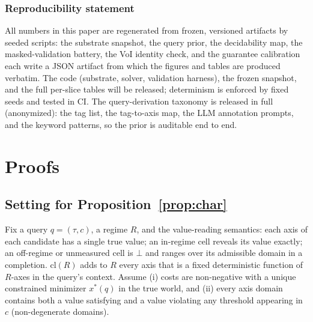 \documentclass{article} %
\newcommand{\cl}{\mathrm{cl}}
\newcommand{\bbot}{\bot}
\begin{document}
\subsubsection*{Reproducibility statement}
All numbers in this paper are regenerated from frozen, versioned artifacts by seeded scripts: the substrate snapshot, the query prior, the decidability map, the masked-validation battery, the VoI identity check, and the guarantee calibration each write a JSON artifact from which the figures and tables are produced verbatim. The code (substrate, solver, validation harness), the frozen snapshot, and the full per-slice tables will be released; determinism is enforced by fixed seeds and tested in CI. The query-derivation taxonomy is released in full (anonymized): the tag list, the tag-to-axis map, the LLM annotation prompts, and the keyword patterns, so the prior is auditable end to end.




\appendix
\section{Proofs}
\label{app:proofs}

\subsection{Setting for Proposition~\ref{prop:char}}
Fix a query $q=(\tau, c)$, a regime $R$, and the value-reading semantics: each axis of each candidate has a single true value; an in-regime cell reveals its value exactly; an off-regime or unmeasured cell is $\bbot$ and ranges over its admissible domain in a completion. $\cl(R)$ adds to $R$ every axis that is a fixed deterministic function of $R$-axes in the query's context. Assume (i) costs are non-negative with a unique constrained minimizer $x^*(q)$ in the true world, and (ii) every axis domain contains both a value satisfying and a value violating any threshold appearing in $c$ (non-degenerate domains).
\end{document}
